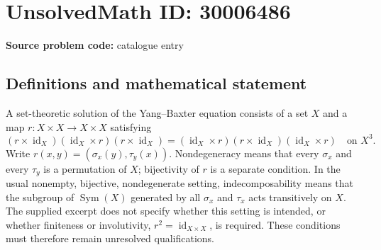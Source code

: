 \documentclass[11pt]{article}
\begin{document}
\section*{UnsolvedMath ID: 30006486}
\textbf{Source problem code:} catalogue entry
\subsection{Definitions and mathematical statement}
A set-theoretic solution of the Yang--Baxter equation consists of a set \(X\) and a map \(r:X\times X\to X\times X\) satisfying
\[
(r\times\operatorname{id}_X)(\operatorname{id}_X\times r)(r\times\operatorname{id}_X)
=
(\operatorname{id}_X\times r)(r\times\operatorname{id}_X)(\operatorname{id}_X\times r)
\quad\text{on }X^3.
\]
Write \(r(x,y)=(\sigma_x(y),\tau_y(x))\). Nondegeneracy means that every \(\sigma_x\) and every \(\tau_y\) is a permutation of \(X\); bijectivity of \(r\) is a separate condition. In the usual nonempty, bijective, nondegenerate setting, indecomposability means that the subgroup of \(\operatorname{Sym}(X)\) generated by all \(\sigma_x\) and \(\tau_x\) acts transitively on \(X\). The supplied excerpt does not specify whether this setting is intended, or whether finiteness or involutivity, \(r^2=\operatorname{id}_{X\times X}\), is required. These conditions must therefore remain unresolved qualifications.
\end{document}
